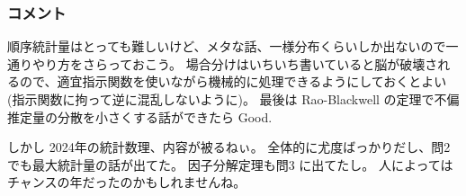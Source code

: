 \documentclass[./main.tex]{subfiles}
\begin{document}
    \subsubsection*{コメント}
    順序統計量はとっても難しいけど、メタな話、一様分布くらいしか出ないので一通りやり方をさらっておこう。
    場合分けはいちいち書いていると脳が破壊されるので、適宜指示関数を使いながら機械的に処理できるようにしておくとよい
    (指示関数に拘って逆に混乱しないように)。
    最後は Rao-Blackwell の定理で不偏推定量の分散を小さくする話ができたら Good.

    しかし 2024年の統計数理、内容が被るねぃ。
    全体的に尤度ばっかりだし、問2 でも最大統計量の話が出てた。
    因子分解定理も問3 に出てたし。
    人によってはチャンスの年だったのかもしれませんね。
\end{document}
